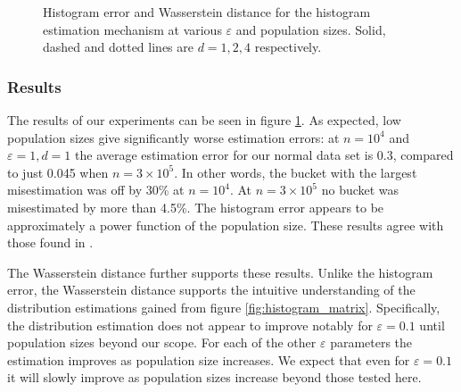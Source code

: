 \documentclass[a4paper,12pt]{article}
\renewcommand{\epsilon}{\varepsilon}
\begin{document}
\begin{figure}
{    }
    \caption{Histogram error and Wasserstein distance for the histogram estimation mechanism at various $\epsilon$ and population sizes. Solid, dashed and dotted lines are $d=1,2,4$ respectively.}
    \label{fig:histogram_errors}
\end{figure}

\subsubsection{Results}

The results of our experiments can be seen in figure \ref{fig:histogram_errors}. As expected, low population sizes give significantly worse estimation errors: at $n=10^4$ and $\epsilon=1,d=1$ the average estimation error for our normal data set is 0.3, compared to just 0.045 when $n=3\times10^5$. In other words, the bucket with the largest misestimation was off by 30\% at $n=10^4$. At $n=3\times 10^5$ no bucket was misestimated by more than 4.5\%. The histogram error appears to be approximately a power function of the population size. These results agree with those found in \cite{microsoft_telemetry}.

The Wasserstein distance further supports these results. Unlike the histogram error, the Wasserstein distance supports the intuitive understanding of the distribution estimations gained from figure \ref{fig:histogram_matrix}. Specifically, the distribution estimation does not appear to improve notably for $\epsilon=0.1$ until population sizes beyond our scope. For each of the other $\epsilon$ parameters the estimation improves as population size increases. We expect that even for $\epsilon=0.1$ it will slowly improve as population sizes increase beyond those tested here. 
\end{document}
